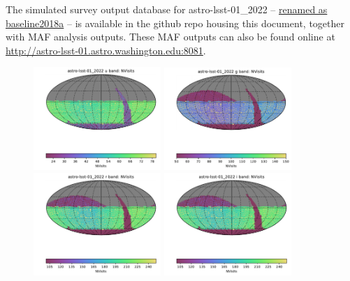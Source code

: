 \documentclass[DM,lsstdraft,authoryear,toc]{lsstdoc}
\begin{document}
The simulated survey output database for astro-lsst-01\_2022 -- \underline{renamed as baseline2018a} -- is available in the github repo housing this document, together with MAF analysis outputs. These MAF outputs can also be found online at \url{http://astro-lsst-01.astro.washington.edu:8081}.


\clearpage
\clearpage

\begin{figure}[ht]
\centering
\includegraphics[width=0.43\textwidth]{figures/astro-lsst-01_2022_NVisits_u_band_HEAL_SkyMap}
\includegraphics[width=0.43\textwidth]{figures/astro-lsst-01_2022_NVisits_g_band_HEAL_SkyMap} \\
\includegraphics[width=0.43\textwidth]{figures/astro-lsst-01_2022_NVisits_r_band_HEAL_SkyMap}
\includegraphics[width=0.43\textwidth]{figures/astro-lsst-01_2022_NVisits_i_band_HEAL_SkyMap} \\

\end{figure}
\end{document}
